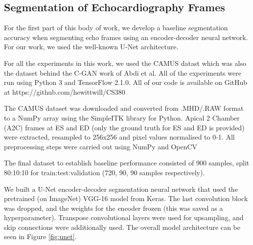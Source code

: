 \subsection{Segmentation of Echocardiography Frames}

For the first part of this body of work, we develop a baseline segmentation
accuracy when segmenting echo frames using an encoder-decoder neural network.
For our work, we used the well-known U-Net architecture. \newline

For all the experiments in this work, we used the CAMUS datast
\cite{leclercDeepLearningSegmentation2019} which was also the dataset behind the
C-GAN work of Abdi et al. All of the experiments were run using Python 3 and
TensorFlow 2.1.0. All of our code is available on GitHub at
https://github.com/hewittwill/CS380 \newline

The CAMUS dataset was downloaded and converted from .MHD/.RAW format to a NumPy
array using the SimpleITK library for Python. Apical 2 Chamber (A2C) frames at
ES and ED (only the ground truth for ES and ED is provided) were extracted,
resampled to 256x256 and pixel values normalised to 0-1. All preprocessing steps
were carried out using NumPy and OpenCV \newline

The final dataset to establish baseline performance consisted of 900 samples,
split 80:10:10 for train:test:validation (720, 90, 90 samples respectively). \newline

We built a U-Net encoder-decoder segmentation neural network that used the
pretrained (on ImageNet) VGG-16 model from Keras. The last convolution block was
dropped, and the weights for the encoder frozen (this was saved as a
hyperparameter). Transpose convolutional layers were used for upsampling, and
skip connections were additionally used. The overall model architecture can be
seen in Figure \ref{fig:unet}. \newline


